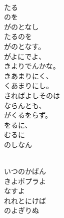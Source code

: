 \documentclass[10pt,b5j]{tarticle} %
\begin{document}
\vspace{1.5em} %
\newcommand{\linespace}{0.5em} %
\newcommand{\blocksize}{0.5\hsize} %
\newcommand{\itemmargin}{3em} %
\begin{enumerate} %
    \setlength{\itemindent}{\itemmargin} %
    \begin{minipage}[c]{\blocksize}
    
        \vspace{\linespace}
        \item~\\
        たる\\
        のを\\
        がのとなし\\
        たるのを\\
        がのとなす。\\
        がよにでよ、\\
        きよりでんかな。\\
        きあまりにく、\\
        くあまりにし。\\
        さればよしそのは\\
        ならんとも、\\
        がくるをらず。\\
        をるに、\\
        むるに\\
        のしなん
        
    \end{minipage}
    \begin{minipage}[c]{\blocksize}
        
        \vspace{\linespace}
        \item~\\
        いつのかばん\\
        きよポプラよ\\
        なすよ\\
        れれとにけば\\
        のよぎりぬ
        

\end{minipage}
\end{enumerate}
\end{document}
